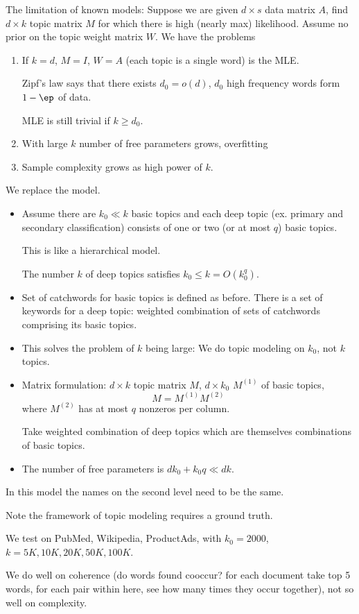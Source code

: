 The limitation of known models: Suppose we are given $d\times s$ data matrix $A$, find $d\times k$ topic matrix $M$ for which there is high (nearly max) likelihood. Assume no prior on the topic weight matrix $W$. We have the problems
\begin{enumerate}
\item
If $k=d$, $M=I$, $W=A$ (each topic is a single word) is the MLE.

Zipf's law says that there exists $d_0=o(d)$, $d_0$ high frequency words form $1-\ep$ of data.

MLE is still trivial if $k\ge d_0$.
\item
With large $k$ number of free parameters grows, overfitting
\item
Sample complexity grows as high power of $k$.
\end{enumerate}
We replace the model.
\begin{itemize}
\item
Assume there are $k_0\ll k$ basic topics and each deep topic  (ex. primary and secondary classification) consists of one or two (or at most $q$) basic topics. 

This is like a hierarchical model. 

The number $k$ of deep topics satisfies $k_0\le k=O(k_0^q)$. 
\item
Set of catchwords for basic topics is defined as before. There is a set of keywords for a deep topic: weighted combination of sets of catchwords comprising its basic topics.
\item
This solves the problem of $k$ being large: 
We do topic modeling on $k_0$, not $k$ topics.
\item
Matrix formulation: $d\times k$ topic matrix $M$, $d\times k_0$ $M^{(1)}$ of basic topics, 
$$
M = M^{(1)}M^{(2)}
$$
where $M^{(2)}$ has at most $q$ nonzeros per column.

Take weighted combination of deep topics which are themselves combinations of basic topics.
\item
The number of free parameters is $dk_0+k_0q\ll dk$. 
\end{itemize}
In this model the names on the second level need to be the same.

Note the framework of topic modeling requires a ground truth. %


We test on PubMed, Wikipedia, ProductAds, with $k_0=2000$, $k=5K, 10K, 20K, 50K, 100K$. 

We do well on coherence (do words found cooccur? for each document take top 5 words, for each pair within here, see how many times they occur together), not so well on complexity.








